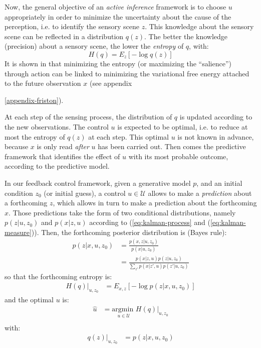 \documentclass[12pt,twoside,openright]{article}
\begin{document}
	Now, the general objective of an \emph{active inference} framework is to choose $u$ appropriately in order to minimize the uncertainty about the cause of the perception, i.e. to identify the sensory scene $z$. 
	This knowledge about the sensory scene can be reflected in a distribution $q(z)$. The better the knowledge (precision) about a sensory scene, the lower the \emph{entropy} of $q$, with:
	$$H(q) = E_z[- \log q(z)]$$
	It is shown in \cite{friston2012perceptions} that minimizing the entropy (or maximizing the ``salience'') through action can be linked to minimizing the variational free energy attached to the future observation $x$ (see appendix{\ref{appendix-friston}).
		
		
	
	At each step of the sensing process, the distribution of $q$ is updated according to the new observations. The control $u$ is expected to be optimal, i.e. to reduce at most the entropy of $q(z)$ at each step. This optimal $u$ is not known in advance, because $x$ is only read \emph{after} $u$ has been carried out. Then comes the predictive framework that identifies the effect of $u$ with its most probable outcome, according to the predictive model.
	
	In our feedback control framework, given a generative model $p$, and an initial condition $z_0$ (or initial guess), a control $u \in \mathcal{U}$ allows to make a \emph{prediction} about a forthcoming $z$, which allows in turn to make a prediction about the forthcoming $x$. Those predictions take the form of two conditional distributions, namely $p(z|u,z_0)$ and $p(x|z,u)$ according to (\ref{eq:kalman-process} and (\ref{eq:kalman-measure})). %
	Then, the forthcoming posterior distribution is (Bayes rule):
	\begin{align*}
	p(z|x,u,z_0) &= \frac{p(x,z|u,z_0)}{p(x|u,z_0)}\\
	             &= \frac{p(x|z,u) p(z|u,z_0)}{\sum_{z'}p(x|z',u) p(z'|u,z_0)}
	\end{align*}
	so that the forthcoming entropy is:
	\begin{align*}
	H(q)|_{u, z_0} &=  E_{x,z}\left[-\log  p(z|x,u,z_0)\right]
	\end{align*}
	and the optimal $u$ is:
	\begin{align*}
	\hat{u} &= \underset{u \in \mathcal{U}}{\text{argmin }} H(q)|_{u, z_0} \\
	\end{align*}
	with:
	\begin{align*}
		q(z)|_{u,z_0} &= p(z|x,u,z_0) \\
	\end{align*}
	
}
\end{document}
